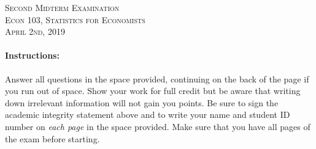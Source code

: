 \documentclass[addpoints,12pt]{exam}
\begin{document}
\begin{center}
\textsc{\large Second Midterm Examination\\ \normalsize Econ 103, Statistics for Economists \\ \vspace{0.5em} April 2nd, 2019}

\vspace{2em}



\end{center}


\vspace{2em}
\begin{center}
\end{center}
\vspace{0.2in}

\vspace{0.2in}

\noindent{}

\vspace{0.2in}

\noindent{}
\hfill
{}

\vspace{2em}

\begin{center}
  \gradetable[h][questions]
\end{center}

\vspace{2em}

\paragraph{Instructions:} Answer all questions in the space provided, continuing on the back of the page if you run out of space. Show your work for full credit but be aware that writing down irrelevant information will not gain you points. Be sure to sign the academic integrity statement above and to write your name and student ID number on \emph{each page} in the space provided. Make sure that you have all pages of the exam before starting.
\end{document}
